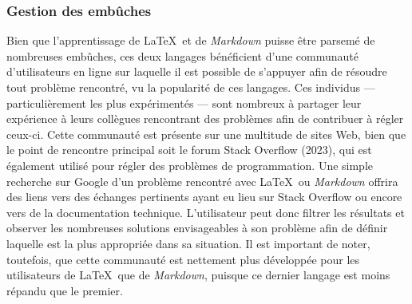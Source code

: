 \documentclass[
  letterpaper,
  DIV=11,
  numbers=noendperiod,
  oneside]{scrreprt}
\begin{document}
\hypertarget{gestion-des-embuxfbches}{%
\subsubsection{Gestion des embûches}\label{gestion-des-embuxfbches}}

Bien que l'apprentissage de \LaTeX{}~et de \emph{Markdown} puisse être
parsemé de nombreuses embûches, ces deux langages bénéficient d'une
communauté d'utilisateurs en ligne sur laquelle il est possible de
s'appuyer afin de résoudre tout problème rencontré, vu la popularité de
ces langages. Ces individus --- particulièrement les plus expérimentés
--- sont nombreux à partager leur expérience à leurs collègues
rencontrant des problèmes afin de contribuer à régler ceux-ci. Cette
communauté est présente sur une multitude de sites Web, bien que le
point de rencontre principal soit le forum Stack Overflow (2023), qui
est également utilisé pour régler des problèmes de programmation. Une
simple recherche sur Google d'un problème rencontré avec \LaTeX{}~ou
\emph{Markdown} offrira des liens vers des échanges pertinents ayant eu
lieu sur Stack Overflow ou encore vers de la documentation technique.
L'utilisateur peut donc filtrer les résultats et observer les nombreuses
solutions envisageables à son problème afin de définir laquelle est la
plus appropriée dans sa situation. Il est important de noter, toutefois,
que cette communauté est nettement plus développée pour les utilisateurs
de \LaTeX{}~que de \emph{Markdown}, puisque ce dernier langage est moins
répandu que le premier.
\end{document}
